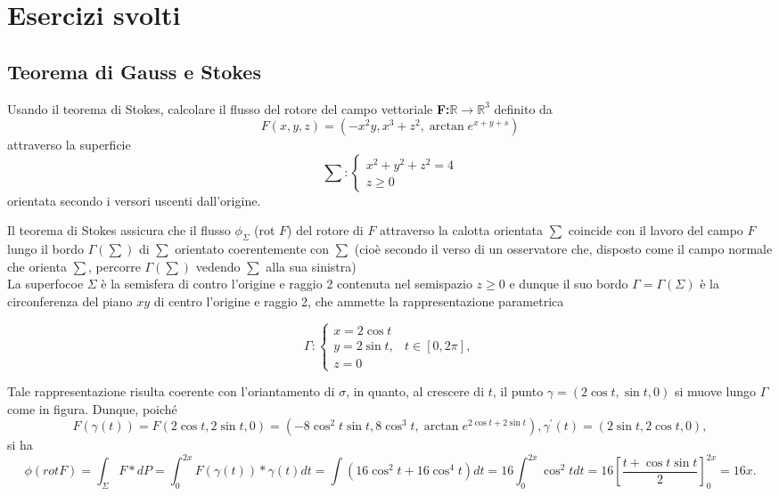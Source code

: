 \chapter{Esercizi svolti}
\section{Teorema di Gauss e Stokes}
\begin{esercizio}
	Usando il teorema di Stokes, calcolare il flusso del rotore del campo vettoriale \textbf{F:}$\mathds{R}\to \mathds{R}^3$ definito da
	\begin{equation*}
		F(x,y,z)=\left(-x^2y, x^3+z^2,\arctan e^{x+y+s}\right)
	\end{equation*}
	attraverso la superficie
	\begin{equation*}
		\sum:\begin{cases}
			x^2+y^2+z^2=4\\
			z\geq 0
		\end{cases}
	\end{equation*}
	orientata secondo i versori uscenti dall'origine.
\end{esercizio}
\begin{svol}
	Il teorema di Stokes assicura che il flusso $\phi_\Sigma$ (rot $F$) del rotore di $F$ attraverso la calotta
	orientata $\sum$ coincide con il lavoro del campo $F$ lungo il bordo $\Gamma(\sum)$ di $\sum$ orientato
	coerentemente con $\sum$ (cioè secondo il verso di un osservatore che, disposto come il campo normale che
	orienta $\sum$, percorre $\Gamma(\sum)$ vedendo $\sum$ alla sua sinistra)\\
	La superfocoe $\Sigma$ è la semisfera di contro l'origine e raggio 2 contenuta nel semispazio $z\geq 0$ e
	dunque il suo bordo $\Gamma =\Gamma (\Sigma)$ è la circonferenza del piano $xy$ di centro l'origine e raggio 2,
	che ammette la rappresentazione parametrica
	\begin{multicols}{2}
		\begin{equation*}
			\Gamma:
			\begin{cases}
				x=2\cos t\\
				y=2\sin t, & t\in [0,2\pi],\\
				z=0
			\end{cases}
		\end{equation*}
	\end{multicols}
	Tale rappresentazione risulta coerente con l'oriantamento di $\sigma$, in quanto, al crescere di $t$,
	il punto $\gamma= (2\cos t, \sin t, 0)$ si muove lungo $\Gamma$ come in figura. Dunque, poiché
	\begin{equation*}
		F(\gamma(t))=F(2\cos t, 2\sin t,0)=(-8\cos^2t\sin t, 8\cos^3t, \arctan e^{2\cos t+2\sin t}),
		\gamma^\prime (t)=(2\sin t, 2\cos t, 0), 
	\end{equation*}
	si ha
	\begin{equation*}
		\phi(rot F)= \int_\Sigma F*dP=\int^{2x}_0F(\gamma(t)) *\gamma(t)dt=\int (16\cos^2t+16\cos^4t)dt =
		16\int^{2x}_{0}\cos^2tdt=16\left[\frac{t+\cos t \sin t}{2}\right]^{2x}_0=16x.
	\end{equation*}
\end{svol}

